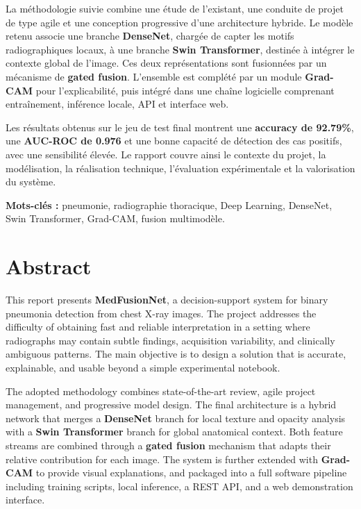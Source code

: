 \documentclass[a4paper,11pt,oneside]{report}
\begin{document}
La méthodologie suivie combine une étude de l’existant, une conduite de projet de type agile et une conception progressive d’une architecture hybride. Le modèle retenu associe une branche \textbf{DenseNet}, chargée de capter les motifs radiographiques locaux, à une branche \textbf{Swin Transformer}, destinée à intégrer le contexte global de l’image. Ces deux représentations sont fusionnées par un mécanisme de \textbf{gated fusion}. L’ensemble est complété par un module \textbf{Grad-CAM} pour l’explicabilité, puis intégré dans une chaîne logicielle comprenant entraînement, inférence locale, API et interface web.

Les résultats obtenus sur le jeu de test final montrent une \textbf{accuracy de 92.79\%}, une \textbf{AUC-ROC de 0.976} et une bonne capacité de détection des cas positifs, avec une sensibilité élevée. Le rapport couvre ainsi le contexte du projet, la modélisation, la réalisation technique, l’évaluation expérimentale et la valorisation du système.

\vspace{0.35cm}
\noindent\textbf{Mots-clés :} pneumonie, radiographie thoracique, Deep Learning, DenseNet, Swin Transformer, Grad-CAM, fusion multimodèle.

\chapter*{Abstract}
This report presents \textbf{MedFusionNet}, a decision-support system for binary pneumonia detection from chest X-ray images. The project addresses the difficulty of obtaining fast and reliable interpretation in a setting where radiographs may contain subtle findings, acquisition variability, and clinically ambiguous patterns. The main objective is to design a solution that is accurate, explainable, and usable beyond a simple experimental notebook.

The adopted methodology combines state-of-the-art review, agile project management, and progressive model design. The final architecture is a hybrid network that merges a \textbf{DenseNet} branch for local texture and opacity analysis with a \textbf{Swin Transformer} branch for global anatomical context. Both feature streams are combined through a \textbf{gated fusion} mechanism that adapts their relative contribution for each image. The system is further extended with \textbf{Grad-CAM} to provide visual explanations, and packaged into a full software pipeline including training scripts, local inference, a REST API, and a web demonstration interface.
\end{document}
